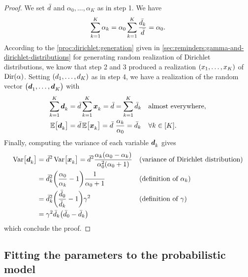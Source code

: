 \begin{proof}
We set $\bar{d}$ and $\alpha_0,\ldots,\alpha_K$ as in step 1. We have
\begin{equation}
  \sum_{k=1}^K \alpha_k = \alpha_0 \sum_{k=1}^K\frac{\bar{d_k}}{\bar{d}} = \alpha_0.
\end{equation}
According to the \cref{proc:dirichlet:generation} given in \cref{sec:reminders:gamma-and-dirichlet-distributions} for generating random realization of Dirichlet distributions, we know that step 2 and 3 produced a realization $\bracket{x_1,\ldots,x_K}$ of $\Dir\bracket{\alpha}$.
Setting $\bracket{\demand_1,\ldots,\demand_K}$ as in step 4, we have a realization of the random vector $\bracket{\va\demand_1,\ldots,\va\demand_K}$ with
\begin{align}
  \sum_{k=1}^K \va\demand_k
  &= \bar{\demand} \sum_{k=1}^K \va x_k
  = \bar{\demand}
  = \sum_{k=1}^K \bar{\demand}_k
  && \mbox{almost everywhere},
  \\
  \espe\sqbracket{\va\demand_k}
  &= \bar{\demand}\espe\sqbracket{\va x_k}
  = \bar{\demand}\ \frac{\alpha_k}{\alpha_0}
  = \bar{\demand}_k
  && \forall k\in\range{K}.
\end{align}
Finally, computing the variance of each variable $\va\demand_k$ gives
\begin{subequations}
\begin{align}
  \vari\sqbracket{\va\demand_k}
  &= \bar{\demand}^2\vari\sqbracket{\va x_k}
  = \bar{\demand}^2
  \frac{\alpha_k\bracket{\alpha_0-\alpha_k}}{\alpha_0^2\bracket{\alpha_0+1}}
  && \mbox{(variance of Dirichlet distribution)}
  \\
  &= \bar{\demand}_k^2 \bracket{\frac{\alpha_0}{\alpha_k}-1}\frac{1}{\alpha_0+1}
  && \mbox{(definition of $\alpha_k$)}
  \\
  &= \bar{\demand}_k^2 \bracket{\frac{\bar{\demand}_0}{\bar{\demand}_k}-1}\gamma^2
  && \mbox{(definition of $\gamma$)}
  \\
  &= \gamma^2 \bar{\demand}_k \bracket{\bar{\demand}_0-\bar{\demand}_k}
\end{align}
\end{subequations}
which conclude the proof.
\end{proof}


\subsection{Fitting the parameters to the probabilistic model}





